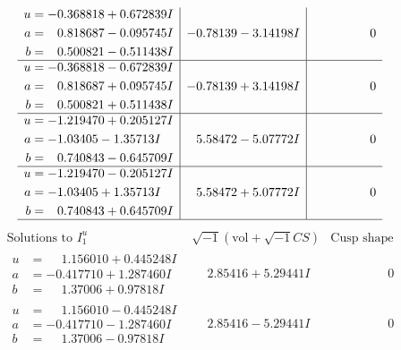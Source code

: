 \documentclass[1p]{elsarticle_modified}
\theoremstyle{definition}
\newcommand{\I}{\sqrt{-1}}
\begin{document}
$$\begin{array}{c|c|c}
\begin{aligned}
u &= -0.368818 + 0.672839 I \\
a &= \phantom{-}0.818687 - 0.095745 I \\
b &= \phantom{-}0.500821 - 0.511438 I\end{aligned}
 & -0.78139 - 3.14198 I & \phantom{-0.000000 } 0 \\ \hline\begin{aligned}
u &= -0.368818 - 0.672839 I \\
a &= \phantom{-}0.818687 + 0.095745 I \\
b &= \phantom{-}0.500821 + 0.511438 I\end{aligned}
 & -0.78139 + 3.14198 I & \phantom{-0.000000 } 0 \\ \hline\begin{aligned}
u &= -1.219470 + 0.205127 I \\
a &= -1.03405 - 1.35713 I \\
b &= \phantom{-}0.740843 - 0.645709 I\end{aligned}
 & \phantom{-}5.58472 - 5.07772 I & \phantom{-0.000000 } 0 \\ \hline\begin{aligned}
u &= -1.219470 - 0.205127 I \\
a &= -1.03405 + 1.35713 I \\
b &= \phantom{-}0.740843 + 0.645709 I\end{aligned}
 & \phantom{-}5.58472 + 5.07772 I & \phantom{-0.000000 } 0\\
 \hline 
 \end{array}$$\newpage$$\begin{array}{c|c|c}  
\text{Solutions to }I^u_{1}& \I (\text{vol} + \sqrt{-1}CS) & \text{Cusp shape}\\
 \hline 
\begin{aligned}
u &= \phantom{-}1.156010 + 0.445248 I \\
a &= -0.417710 + 1.287460 I \\
b &= \phantom{-}1.37006 + 0.97818 I\end{aligned}
 & \phantom{-}2.85416 + 5.29441 I & \phantom{-0.000000 } 0 \\ \hline\begin{aligned}
u &= \phantom{-}1.156010 - 0.445248 I \\
a &= -0.417710 - 1.287460 I \\
b &= \phantom{-}1.37006 - 0.97818 I\end{aligned}
 & \phantom{-}2.85416 - 5.29441 I & \phantom{-0.000000 } 0 \\ \hline\begin{aligned}

\end{aligned}
\end{array}$$
\end{document}
